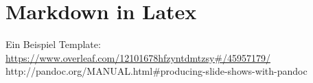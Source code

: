 \chapter{Markdown in Latex}

Ein Beispiel Template: \url{https://www.overleaf.com/12101678hfzyntdmtzsy#/45957179/}
http://pandoc.org/MANUAL.html#producing-slide-shows-with-pandoc